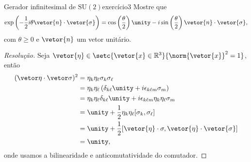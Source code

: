 \begin{exercício}{Gerador infinitesimal de \(\mathrm{SU}(2)\)}{exercício3}
    Mostre que
    \begin{equation*}
        \exp\left(-\frac12i\theta \vetor{n} \cdot \vetor{\sigma}\right) = \cos\left(\frac{\theta}{2}\right) \unity - i \sin\left(\frac{\theta}{2}\right)\vetor{n}\cdot\vetor{\sigma},
    \end{equation*}
    com \(\theta \geq 0\) e \(\vetor{n}\) um vetor unitário.
\end{exercício}
\begin{proof}[Resolução]
    Seja \(\vetor{\eta} \in \setc{\vetor{x} \in \mathbb{R}^3}{\norm{\vetor{x}}^2 = 1}\), então
    \begin{align*}
        (\vetor \eta \cdot \vetor \sigma)^2 &= \eta_k \eta_\ell \sigma_k \sigma_\ell\\
                                        &= \eta_k \eta_\ell \left(\delta_{k\ell}\unity + i \epsilon_{k\ell m}\sigma_m\right)\\
                                        &= \eta_k \eta_\ell \delta_{k \ell}\unity + i \epsilon_{k\ell m} \eta_k \eta_\ell \sigma_m\\
                                        &= \unity + \frac12 \eta_k \eta_\ell [\sigma_k, \sigma_\ell]\\
                                        &= \unity + \frac12[\vetor{\eta}\cdot \sigma, \vetor{\eta}\cdot\vetor{\sigma}]\\
                                        &= \unity,
    \end{align*}
    onde usamos a bilinearidade e anticomutatividade do comutador.


\end{proof}
